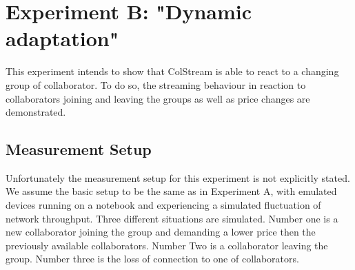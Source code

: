 \section{Experiment B: "Dynamic adaptation"}
This experiment intends to show that ColStream is able to react to a changing group of collaborator. To do so, the streaming behaviour in reaction to collaborators joining and leaving the groups as well as price changes are demonstrated.
\subsection{Measurement Setup}
Unfortunately the measurement setup for this experiment is not explicitly stated. We assume the basic setup to be the same as in Experiment A, with emulated devices running on a notebook and experiencing a simulated fluctuation of network throughput. Three different situations are simulated. Number one is a new collaborator joining the group and demanding a lower price then the previously available collaborators. Number Two is a collaborator leaving the group. Number three is the loss of connection to one of collaborators.
